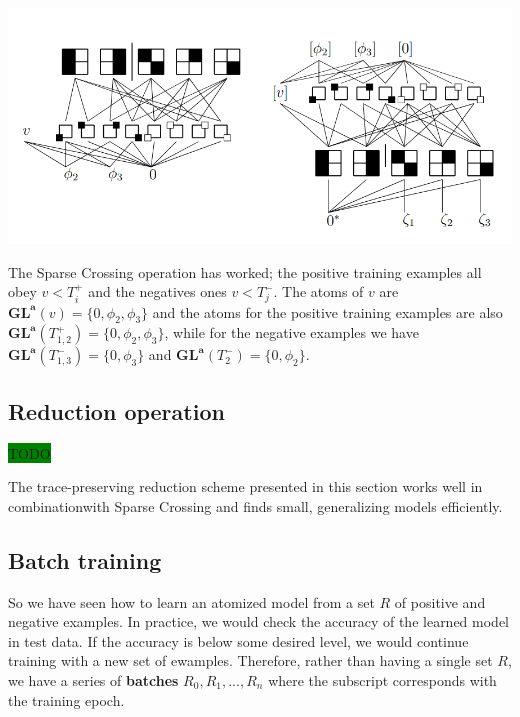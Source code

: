 \documentclass[a4paper, 11pt]{article}
\begin{document}
\begin{center}
    \includegraphics[scale = 0.6]{final_state.png}
\end{center}

The Sparse Crossing operation has worked; the positive training examples all obey $v < T_i^+$ and the negatives ones $v < T_j^-$. The atoms of $v$ are $\boldsymbol{GL}^{\boldsymbol{a}}(v) = \{ 0, \phi_2, \phi_3 \}$ and the atoms for the positive training examples are also $\boldsymbol{GL}^{\boldsymbol{a}}(T_{1,2}^+) = \{ 0, \phi_2, \phi_3 \}$, while for the negative examples we have $\boldsymbol{GL}^{\boldsymbol{a}}(T_{1,3}^-) = \{ 0, \phi_3 \}$ and $\boldsymbol{GL}^{\boldsymbol{a}}(T_2^-) = \{ 0, \phi_2 \}$.


\subsection{Reduction operation}

\colorbox{green}{TODO}

The trace-preserving reduction scheme presented in this section works well in combinationwith Sparse Crossing and finds small, generalizing models efficiently. 

\subsection{Batch training}

So we have seen how to learn an atomized model from a set $R$ of positive and negative examples. In practice, we would check the accuracy of the learned model in test data. If the accuracy is below some desired level, we would continue training with a new set of ewamples. Therefore, rather than having a single set $R$, we have a series of \textbf{batches} $R_0, R_1, ..., R_n$ where the subscript corresponds with the training epoch.
\end{document}
